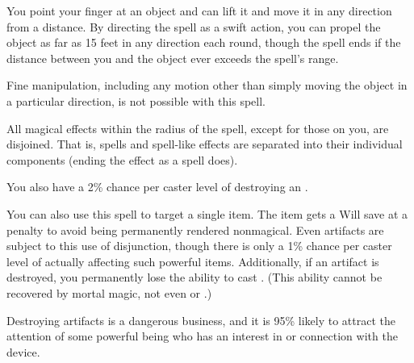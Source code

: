 \spellrng{\rngclose}
\spelldur{\durshort}
\begin{spelleffect}
  You point your finger at an object and can lift it and move it in any direction from a distance. By directing the spell as a swift action, you can propel the object as far as 15 feet in any direction each round, though the spell ends if the distance between you and the object ever exceeds the spell's range.
\end{spelleffect}
\begin{spellnotes}
  Fine manipulation, including any motion other than simply moving the object in a particular direction, is not possible with this spell.
\end{spellnotes}

\spellrng{\rngmed}
\begin{spelleffect}
  All magical effects within the radius of the spell, except for those on you, are disjoined. That is, spells and spell-like effects are separated into their individual components (ending the effect as a  spell does).
  \par You also have a 2\% chance per caster level of destroying an .
  \par You can also use this spell to target a single item. The item gets a Will save at a  penalty to avoid being permanently rendered nonmagical. Even artifacts are subject to this use of disjunction, though there is only a 1\% chance per caster level of actually affecting such powerful items. Additionally, if an artifact is destroyed, you permanently lose the ability to cast . (This ability cannot be recovered by mortal magic, not even  or .)
  \par {} Destroying artifacts is a dangerous business, and it is 95\% likely to attract the attention of some powerful being who has an interest in or connection with the device.
\end{spelleffect}

